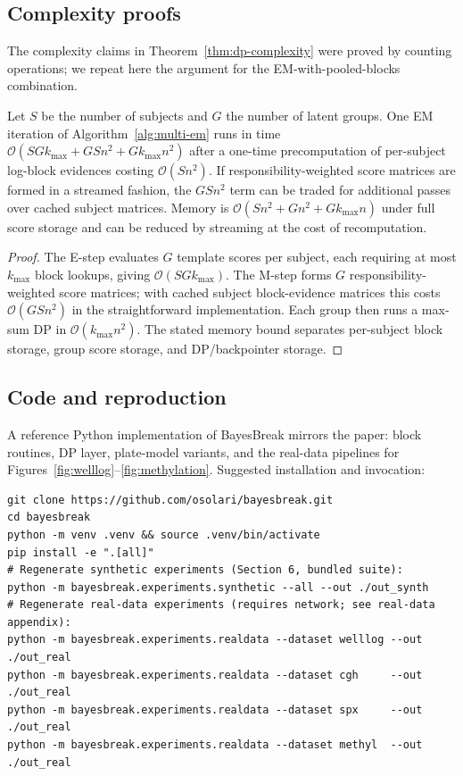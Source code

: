 \subsection{Complexity proofs}
\label{app:complexity-proofs}

The complexity claims in Theorem~\ref{thm:dp-complexity} were proved by counting operations; we
repeat here the argument for the EM-with-pooled-blocks combination.

\begin{proposition}
Let $S$ be the number of subjects and $G$ the number of latent groups. One EM iteration of
Algorithm~\ref{alg:multi-em} runs in time
$\mathcal{O}(SGk_{\max}+GSn^2+Gk_{\max}n^2)$ after a one-time precomputation of per-subject
log-block evidences costing $\mathcal{O}(Sn^2)$. If responsibility-weighted score matrices are
formed in a streamed fashion, the $GSn^2$ term can be traded for additional passes over cached
subject matrices. Memory is $\mathcal{O}(Sn^2+Gn^2+Gk_{\max}n)$ under full score storage and can be
reduced by streaming at the cost of recomputation.
\end{proposition}

\begin{proof}
The E-step evaluates $G$ template scores per subject, each requiring at most $k_{\max}$ block
lookups, giving $\mathcal{O}(SGk_{\max})$. The M-step forms $G$ responsibility-weighted score
matrices; with cached subject block-evidence matrices this costs $\mathcal{O}(GSn^2)$ in the
straightforward implementation. Each group then runs a max-sum DP in $\mathcal{O}(k_{\max}n^2)$.
The stated memory bound separates per-subject block storage, group score storage, and DP/backpointer
storage.
\end{proof}

\subsection{Code and reproduction}
\label{app:code}

A reference Python implementation of BayesBreak mirrors the paper: block routines, DP layer,
plate-model variants, and the real-data pipelines for Figures~\ref{fig:welllog}--\ref{fig:methylation}.
Suggested installation and invocation:

\begin{verbatim}
git clone https://github.com/osolari/bayesbreak.git
cd bayesbreak
python -m venv .venv && source .venv/bin/activate
pip install -e ".[all]"
# Regenerate synthetic experiments (Section 6, bundled suite):
python -m bayesbreak.experiments.synthetic --all --out ./out_synth
# Regenerate real-data experiments (requires network; see real-data appendix):
python -m bayesbreak.experiments.realdata --dataset welllog --out ./out_real
python -m bayesbreak.experiments.realdata --dataset cgh     --out ./out_real
python -m bayesbreak.experiments.realdata --dataset spx     --out ./out_real
python -m bayesbreak.experiments.realdata --dataset methyl  --out ./out_real
\end{verbatim}

